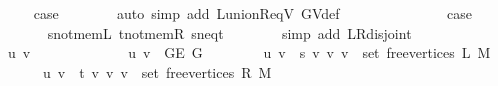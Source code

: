 \begin{isabellebody}
\ \ \ \ \isamarkupfalse%
\ {\isacharquery}{\kern0pt}case\isanewline
\ \ \ \ \ \ \isamarkupfalse%
\ {\isacharparenleft}{\kern0pt}auto\ simp\ add{\isacharcolon}{\kern0pt}\ L{\isacharunderscore}{\kern0pt}union{\isacharunderscore}{\kern0pt}R{\isacharunderscore}{\kern0pt}eq{\isacharunderscore}{\kern0pt}V\ G{\isachardot}{\kern0pt}V{\isacharunderscore}{\kern0pt}def{\isacharparenright}{\kern0pt}\isanewline
\ \ \isamarkupfalse%
\isanewline
\ \ \ \ \isamarkupfalse%
\ {}\isanewline
\ \ \ \ \isamarkupfalse%
\ {\isacharquery}{\kern0pt}case\isanewline
\ \ \ \ \ \ \isamarkupfalse%
\ s{\isacharunderscore}{\kern0pt}not{\isacharunderscore}{\kern0pt}mem{\isacharunderscore}{\kern0pt}L\ t{\isacharunderscore}{\kern0pt}not{\isacharunderscore}{\kern0pt}mem{\isacharunderscore}{\kern0pt}R\ s{\isacharunderscore}{\kern0pt}neq{\isacharunderscore}{\kern0pt}t\isanewline
\ \ \ \ \ \ \isamarkupfalse%
\ {\isacharparenleft}{\kern0pt}simp\ add{\isacharcolon}{\kern0pt}\ L{\isacharunderscore}{\kern0pt}R{\isacharunderscore}{\kern0pt}disjoint{\isacharparenright}{\kern0pt}\isanewline
\ \ \isamarkupfalse%
\isanewline
\ \ \ \ \isamarkupfalse%
\ {\isacharparenleft}{\kern0pt}{}\ u\ v{\isacharparenright}{\kern0pt}\isanewline
\ \ \ \ \isamarkupfalse%
\ \isamarkupfalse%
\isanewline
\ \ \ \ \ \ {\isacharparenleft}{\kern0pt}{}{\isacharparenright}{\kern0pt}\ {\isachardoublequoteopen}{\isacharbraceleft}{\kern0pt}u{\isacharcomma}{\kern0pt}\ v{\isacharbraceright}{\kern0pt}\ {\isasymin}\ G{\isachardot}{\kern0pt}E\ G{\isachardoublequoteclose}\ {\isacharbar}{\kern0pt}\isanewline
\ \ \ \ \ \ {\isacharparenleft}{\kern0pt}{}{\isacharparenright}{\kern0pt}\ {\isachardoublequoteopen}{\isacharbraceleft}{\kern0pt}u{\isacharcomma}{\kern0pt}\ v{\isacharbraceright}{\kern0pt}\ {\isasymin}\ {\isacharbraceleft}{\kern0pt}{\isacharbraceleft}{\kern0pt}s{\isacharcomma}{\kern0pt}\ v{\isacharbraceright}{\kern0pt}\ {\isacharbar}{\kern0pt}v{\isachardot}{\kern0pt}\ v\ {\isasymin}\ set\ {\isacharparenleft}{\kern0pt}free{\isacharunderscore}{\kern0pt}vertices\ L\ M{\isacharparenright}{\kern0pt}{\isacharbraceright}{\kern0pt}{\isachardoublequoteclose}\ {\isacharbar}{\kern0pt}\isanewline
\ \ \ \ \ \ {\isacharparenleft}{\kern0pt}{}{\isacharparenright}{\kern0pt}\ {\isachardoublequoteopen}{\isacharbraceleft}{\kern0pt}u{\isacharcomma}{\kern0pt}\ v{\isacharbraceright}{\kern0pt}\ {\isasymin}\ {\isacharbraceleft}{\kern0pt}{\isacharbraceleft}{\kern0pt}t{\isacharcomma}{\kern0pt}\ v{\isacharbraceright}{\kern0pt}\ {\isacharbar}{\kern0pt}v{\isachardot}{\kern0pt}\ v\ {\isasymin}\ set\ {\isacharparenleft}{\kern0pt}free{\isacharunderscore}{\kern0pt}vertices\ R\ M{\isacharparenright}{\kern0pt}{\isacharbraceright}{\kern0pt}{\isachardoublequoteclose}\isanewline

\end{isabellebody}
